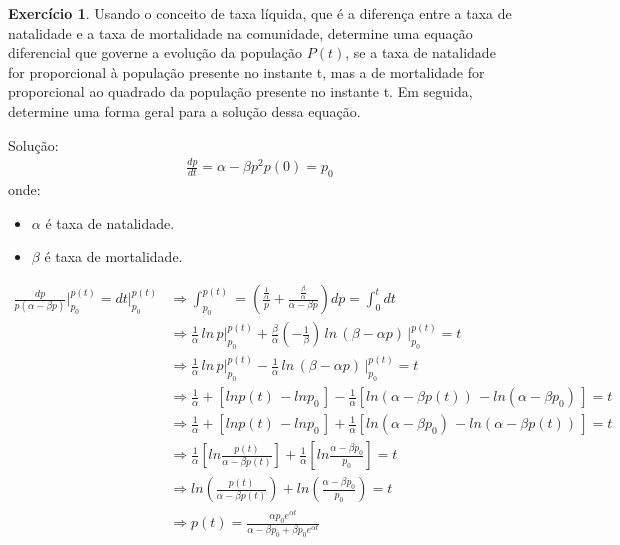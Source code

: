 \documentclass[a4paper,12pt,reqno,natbib]{amsart}
\theoremstyle{definition}
\newtheorem{exercise}{Exerc\'icio}
\newcommand{\matbox}[2]{\hspace{2pt}#1 \hspace{2pt} #2 \hspace{2pt}}
\begin{document}
\begin{exercise}
Usando o conceito de taxa líquida, que é a diferença entre a taxa de natalidade e a taxa de mortalidade na comunidade, determine uma equação diferencial que governe a evolução 
da população $P(t)$, se a taxa de natalidade for proporcional à população presente no instante t, mas a de mortalidade for proporcional ao quadrado da população presente no 
instante t. Em seguida, determine uma forma geral para a solução dessa equação.
\end{exercise}
Solu\c c\~ao:
\begin{align*}
	\frac{dp}{dt} = \alpha - \beta p^{2}
	p(0) = p_0
\end{align*}
onde:
\begin{itemize}
	\item $\alpha$ \'e taxa de natalidade.
	\item $\beta$ \'e taxa de mortalidade.
\end{itemize}
\begin{align*}
	\frac{dp}{p(\alpha - \beta p)} \bigg \vert_{p_0}^{p(t)}= dt \bigg \vert_{p_0}^{p(t)} 
	&\Rightarrow \int_{p_0}^{p(t)} =\left (\frac{\frac{1}{\alpha} }{p} +
	\frac{\frac{\beta}{\alpha} }{\alpha - \beta p}  \right ) dp = \int_{0}^{t} dt\\
	&\Rightarrow \frac{1}{\alpha} \hspace {2pt}ln \hspace{2pt}p \bigg \vert_{p_0}^{p(t)} +
	\frac{\beta}{\alpha}(-\frac{1}{\beta}) \matbox{ln}{(\beta - \alpha p)}\bigg |_{p_0}^{p(t)} = t \\
	&\Rightarrow \frac{1}{\alpha} \hspace {2pt}ln \hspace{2pt}p \bigg \vert_{p_0}^{p(t)} -
	\frac{1}{\alpha} \matbox{ln}{(\beta - \alpha p)}\bigg |_{p_0}^{p(t)} = t \\
	&\Rightarrow \frac{1}{\alpha} +\left [ ln p(t) \hspace{2pt} - ln p_0\hspace{2pt} \right ] - 
	\frac{1}{\alpha} \left [ ln (\alpha - \beta p(t)) \hspace{2pt} - ln (\alpha - \beta p_0)\hspace{2pt} \right ] = t \\
	&\Rightarrow \frac{1}{\alpha} +\left [ ln p(t) \hspace{2pt} - ln p_0\hspace{2pt} \right ] + 
	\frac{1}{\alpha} \left [ ln (\alpha - \beta p_0)\hspace{2pt}  - ln (\alpha - \beta p(t)) \hspace{2pt} \right ]= t\\
	&\Rightarrow  \frac{1}{\alpha}\left [ ln \frac{p(t)}{\alpha - \beta p(t)}\right ] + \frac{1}{\alpha}\left
	[ ln \frac{\alpha - \beta p_0}{p_0}\right ] = t \\
	&\Rightarrow   ln \left (\frac{p(t)}{\alpha - \beta p(t)}\right ) + 
	 ln \left ( \frac{\alpha - \beta p_0}{p_0}\right) =  t \\
	 &\Rightarrow \boxed{p(t) = \frac{\alpha p_0 e^{\alpha t}}{\alpha - \beta p_0 + \beta p_0 e^{\alpha t}}}
\end{align*}
\vspace{0.6 cm}
\end{document}
